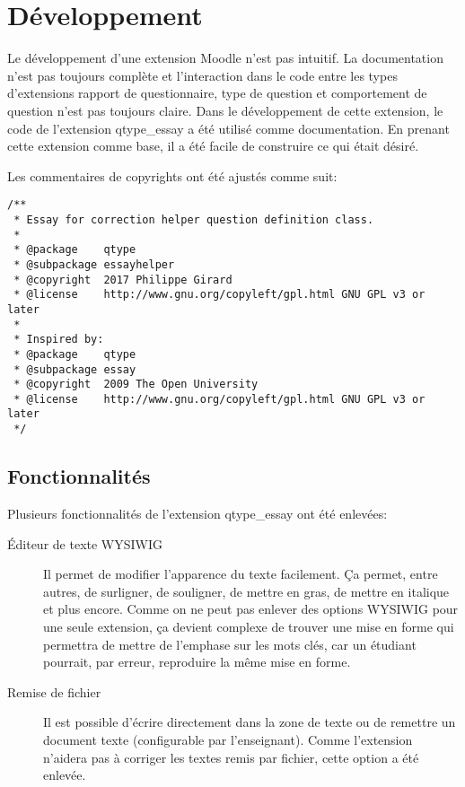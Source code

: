 \chapter{Développement}

Le développement d'une extension Moodle n'est pas intuitif. La documentation n'est pas toujours complète et l'interaction dans le code entre les types d'extensions rapport de questionnaire, type de question et comportement de question n'est pas toujours claire. Dans le développement de cette extension, le code de l'extension \og qtype\_essay \fg{} a été utilisé comme documentation. En prenant cette extension comme base, il a été facile de construire ce qui était désiré.

Les commentaires de copyrights ont été ajustés comme suit:

\begin{lstlisting}[frame=l]
/**
 * Essay for correction helper question definition class.
 *
 * @package    qtype
 * @subpackage essayhelper
 * @copyright  2017 Philippe Girard
 * @license    http://www.gnu.org/copyleft/gpl.html GNU GPL v3 or later
 *
 * Inspired by:
 * @package    qtype
 * @subpackage essay
 * @copyright  2009 The Open University
 * @license    http://www.gnu.org/copyleft/gpl.html GNU GPL v3 or later
 */
\end{lstlisting}

\section{Fonctionnalités}

Plusieurs fonctionnalités de l'extension \og qtype\_essay \fg{} ont été enlevées:

\begin{description}
  \item[Éditeur de texte WYSIWIG]
  
  Il permet de modifier l'apparence du texte facilement. Ça permet, entre autres, de surligner, de souligner, de mettre en gras, de mettre en italique et plus encore. Comme on ne peut pas enlever des options WYSIWIG pour une seule extension, ça devient complexe de trouver une mise en forme qui permettra de mettre de l'emphase sur les mots clés, car un étudiant pourrait, par erreur, reproduire la même mise en forme.
  
  \item[Remise de fichier]
  
  Il est possible d'écrire directement dans la zone de texte ou de remettre un document texte (configurable par l'enseignant). Comme l'extension n'aidera pas à corriger les textes remis par fichier, cette option a été enlevée.
\end{description}

